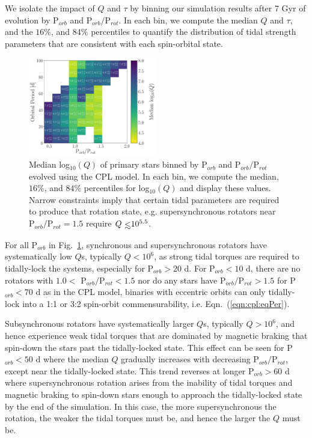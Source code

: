 \documentclass[twocolumn]{aastex61}
\def\lsim{~\rlap{$<$}{\lower 1.0ex\hbox{$\sim$}}}
\begin{document}
We isolate the impact of $Q$ and $\tau$ by binning our simulation results after 7 Gyr of evolution by P$_{orb}$ and P$_{orb}/$P$_{rot}$.  In each bin, we compute the median $Q$ and $\tau$, and the $16\%$, and $84\%$ percentiles to quantify the distribution of tidal strength parameters that are consistent with each spin-orbital state.  

\begin{figure}
	\includegraphics[width=0.5\textwidth]{../Plots/porbProtPorbQHist.pdf}
   \caption{Median log$_{10}(Q)$ of primary stars binned by P$_{orb}$ and P$_{orb}/$P$_{rot}$ evolved using the CPL model.  In each bin, we compute the median, $16\%$, and $84\%$ percentiles for log$_{10}(Q)$ and display these values. Narrow constraints imply that certain tidal parameters are required to produce that rotation state, e.g. supersynchronous rotators near P$_{orb}/$P$_{rot} = 1.5$ require $Q \lsim 10^{5.5}$. }%
    \label{fig:qmap}%
\end{figure}

For all P$_{orb}$ in Fig.~\ref{fig:qmap}, synchronous and supersynchronous rotators have systematically low $Q$s, typically $Q < 10^6$, as strong tidal torques are required to tidally-lock the systems, especially for P$_{orb} > 20$ d. For P$_{orb} < 10$ d, there are no rotators with $1.0 <$ P$_{orb}/$P$_{rot} < 1.5$ nor do any stars have P$_{orb}/$P$_{rot} > 1.5$ for P$_{orb} < 70$ d as in the CPL model, binaries with eccentric orbits can only tidally-lock into a 1:1 or 3:2 spin-orbit commensurability, i.e. Eqn.~(\ref{eqn:cpl:eqPer}).   

Subsynchronous rotators have systematically larger $Q$s, typically $Q > 10^6$, and hence experience weak tidal torques that are dominated by magnetic braking that spin-down the stars past the tidally-locked state.  This effect can be seen for P$_{orb} < 50$ d where the median $Q$ gradually increases with decreasing P$_{orb}/$P$_{rot}$, except near the tidally-locked state.  This trend reverses at longer P$_{orb} > 60$ d where supersynchronous rotation arises from the inability of tidal torques and magnetic braking to spin-down stars enough to approach the tidally-locked state by the end of the simulation.  In this case, the more supersynchronous the rotation, the weaker the tidal torques must be, and hence the larger the $Q$ must be. 
\end{document}
